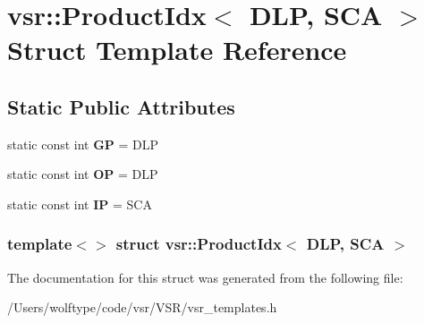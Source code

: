 \hypertarget{structvsr_1_1_product_idx_3_01_d_l_p_00_01_s_c_a_01_4}{\section{vsr\-:\-:Product\-Idx$<$ D\-L\-P, S\-C\-A $>$ Struct Template Reference}
\label{structvsr_1_1_product_idx_3_01_d_l_p_00_01_s_c_a_01_4}
}
\subsection*{Static Public Attributes}
\begin{DoxyCompactItemize}
\item 
\hypertarget{structvsr_1_1_product_idx_3_01_d_l_p_00_01_s_c_a_01_4_a5dd9e8703c21c09bd5950b8cfc410c25}{static const int {\bfseries G\-P} = D\-L\-P}\label{structvsr_1_1_product_idx_3_01_d_l_p_00_01_s_c_a_01_4_a5dd9e8703c21c09bd5950b8cfc410c25}

\item 
\hypertarget{structvsr_1_1_product_idx_3_01_d_l_p_00_01_s_c_a_01_4_aa9c6a6041cb82545a1f2070ed5d87bd6}{static const int {\bfseries O\-P} = D\-L\-P}\label{structvsr_1_1_product_idx_3_01_d_l_p_00_01_s_c_a_01_4_aa9c6a6041cb82545a1f2070ed5d87bd6}

\item 
\hypertarget{structvsr_1_1_product_idx_3_01_d_l_p_00_01_s_c_a_01_4_aec0d3fa8d804cf9c7b55462ff0ccab44}{static const int {\bfseries I\-P} = S\-C\-A}\label{structvsr_1_1_product_idx_3_01_d_l_p_00_01_s_c_a_01_4_aec0d3fa8d804cf9c7b55462ff0ccab44}

\end{DoxyCompactItemize}
\subsubsection*{template$<$$>$ struct vsr\-::\-Product\-Idx$<$ D\-L\-P, S\-C\-A $>$}



The documentation for this struct was generated from the following file\-:\begin{DoxyCompactItemize}
\item 
/\-Users/wolftype/code/vsr/\-V\-S\-R/vsr\-\_\-templates.\-h\end{DoxyCompactItemize}
